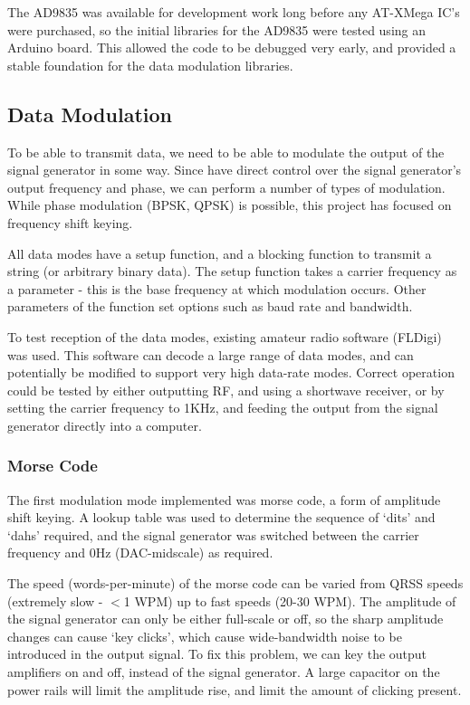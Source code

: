 \documentclass[a4paper,12pt]{article}
\begin{document}
The AD9835 was available for development work long before any AT-XMega IC's were purchased, so the initial libraries for the AD9835 were tested using an Arduino board. This allowed the code to be debugged very early, and provided a stable foundation for the data modulation libraries.


\subsection{Data Modulation}
To be able to transmit data, we need to be able to modulate the output of the signal generator in some way. Since have direct control over the signal generator's output frequency and phase, we can perform a number of types of modulation. While phase modulation (BPSK, QPSK) is possible, this project has focused on frequency shift keying.

All data modes have a setup function, and a blocking function to transmit a string (or arbitrary binary data). The setup function takes a carrier frequency as a parameter - this is the base frequency at which modulation occurs. Other parameters of the function set options such as baud rate and bandwidth.

To test reception of the data modes, existing amateur radio software (FLDigi) was used. This software can decode a large range of data modes, and can potentially be modified to support very high data-rate modes. Correct operation could be tested by either outputting RF, and using a shortwave receiver, or by setting the carrier frequency to 1KHz, and feeding the output from the signal generator directly into a computer.

\subsubsection*{Morse Code}
The first modulation mode implemented was morse code, a form of amplitude shift keying. A lookup table was used to determine the sequence of `dits' and `dahs' required, and the signal generator was switched between the carrier frequency and 0Hz (DAC-midscale) as required.

The speed (words-per-minute) of the morse code can be varied from QRSS speeds (extremely slow - $<$1 WPM) up to fast speeds (20-30 WPM). The amplitude of the signal generator can only be either full-scale or off, so the sharp amplitude changes can cause `key clicks', which cause wide-bandwidth noise to be introduced in the output signal. To fix this problem, we can key the output amplifiers on and off, instead of the signal generator. A large capacitor on the power rails will limit the amplitude rise, and limit the amount of clicking present.
\end{document}
